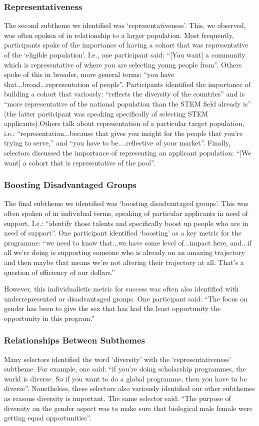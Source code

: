 \subsubsection{Representativeness}
The second subtheme we identified was `representativeness'. This, we observed, was often spoken of in relationship to a larger population. Most frequently, participants spoke of the importance of having a cohort that was representative of the `eligible population'. I.e., one participant said: ``[You want] a community which is representative of where you are selecting young people from''. Others spoke of this in broader, more general terms: ``you have that...broad...representation of people''. Participants identified the importance of building a cohort that variously: ``reflects the diversity of the countries'' and is ``more representative of the national population than the STEM field already is'' (the latter participant was speaking specifically of selecting STEM applicants).Others talk about representation of a particular target population, i.e.: ``representation...because that gives you insight for the people that you're trying to serve,'' and ``you have to be....reflective of your market''. Finally, selectors discussed the importance of representing an applicant population: ``[We want] a cohort that is representative of the pool''.

\subsubsection{Boosting Disadvantaged Groups}
The final subtheme we identified was `boosting disadvantaged groups'. This was often spoken of in individual terms, speaking of particular applicants in need of support. I.e.: ``identify those talents and specifically boost up people who are in need of support''. One participant identified `boosting' as a key metric for the programme: ``we need to know that...we have some level of...impact here, and...if all we're doing is supporting someone who is already on an amazing trajectory and then maybe that means we're not altering their trajectory at all. That's a question of efficiency of our dollars.''

However, this individualistic metric for success was often also identified with underrepresented or disadvantaged groups. One participant said: ``The focus on gender has been to give the sex that has had the least opportunity the opportunity in this program.''

\subsubsection{Relationships Between Subthemes}
Many selectors identified the word `diversity' with the `representativeness' subtheme. For example, one said: ``if you're doing scholarship programmes, the world is diverse. So if you want to do a global programme, then you have to be diverse''. Nonetheless, these selectors also variously identified our other subthemes as reasons diversity is important. The same selector said: ``The purpose of diversity on the gender aspect was to make sure that biological male female were getting equal opportunities''.

